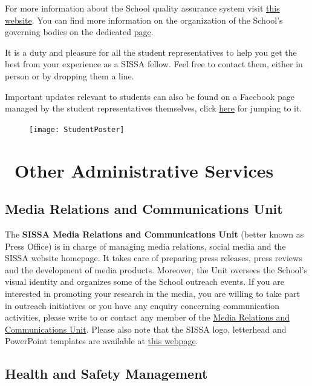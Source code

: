 \documentclass{sissavademecum}
\begin{document}
For more information about the School quality assurance system visit \href{https://www.sissa.it/qualita}{this website}. You can find more information on the organization of the School's governing bodies on the dedicated \href{https://www.sissa.it/general-organization}{page}.

It is a duty and pleasure for all the student representatives to help you get the best from your experience as a SISSA fellow. Feel free to contact them, either in person or by dropping them a line.

Important updates relevant to students can also be found on a Facebook page managed by the student representatives themselves, click \href{https://www.facebook.com/groups/sissastudents/}{here} for jumping to it.

\begin{figure}
	\vspace*{-12pt}
	\texttt{[image: StudentPoster]}
\end{figure}




\chapter{\texorpdfstring{\faChartBar\ }{}Other Administrative Services}


\section{Media Relations and Communications Unit}

The \textbf{SISSA Media Relations and Communications Unit} (better known as Press Office) is in charge of managing media relations, social media and the SISSA website homepage. It takes care of preparing press releases, press reviews and the development of media products. Moreover, the Unit oversees the School's visual identity and organizes some of the School outreach events. If you are interested in promoting your research in the media, you are willing to take part in outreach initiatives or you have any enquiry concerning communication activities, please write to  or contact any member of the \href{https://www.sissa.it/media-and-press}{Media Relations and Communications Unit}. Please also note that the SISSA logo, letterhead and PowerPoint templates are available at \href{https://www.sissa.it/researchers-and-sissa-staff}{this webpage}.


\section{Health and Safety Management}
\end{document}
